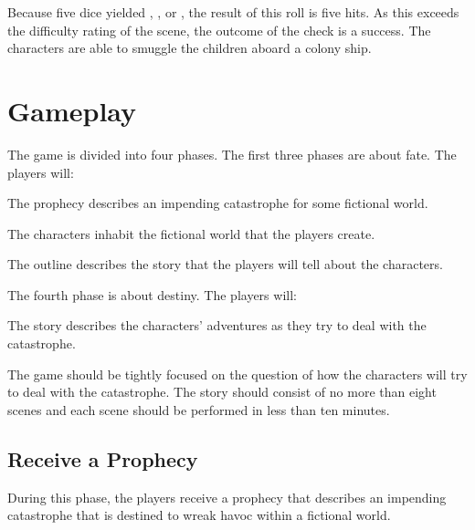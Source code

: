 \documentclass[12pt, a5paper, parskip=half-, footheight=1.4cm]{scrartcl}
\begin{document}
Because five dice yielded ,  , or , the result of this roll is five hits.
As this exceeds the difficulty rating of the scene, the outcome of the check is a success.
The characters are able to smuggle the children aboard a colony ship.

\newpage

\section*{Gameplay} \label{section:gameplay}
The game is divided into four phases.
The first three phases are about fate.
The players will:
\begin{description}[labelindent=0.25cm, leftmargin=\widthof{\hspace{0.25cm}\textbullet\space}, font=\normalfont\textbullet\bfseries\cinzel\small\space]
  \item[{\hyperref[subsection:receive-a-prophecy]{Receive a Prophecy}:}] The prophecy describes an impending catastrophe for some fictional world.
  \item[{\hyperref[subsection:create-characters]{Create Characters}:}] The characters inhabit the fictional world that the players create.
  \item[{\hyperref[subsection:write-an-outline]{Write an Outline}:}] The outline describes the story that the players will tell about the characters.
\end{description}

The fourth phase is about destiny.
The players will:
\begin{description}[labelindent=0.25cm, leftmargin=\widthof{\hspace{0.25cm}\textbullet\space}, font=\normalfont\textbullet\bfseries\cinzel\small\space]
	\item[{\hyperref[subsection:tell-the-story]{Tell the Story}:}] The story describes the characters' adventures as they try to deal with the catastrophe.
\end{description}

\bigskip

The game should be tightly focused on the question of how the characters will try to deal with the catastrophe.
The story should consist of no more than eight scenes and each scene should be performed in less than ten minutes. 

\subsection*{Receive a Prophecy} \label{subsection:receive-a-prophecy}
During this phase, the players receive a prophecy that describes an impending catastrophe that is destined to wreak havoc within a fictional world.
\end{document}
